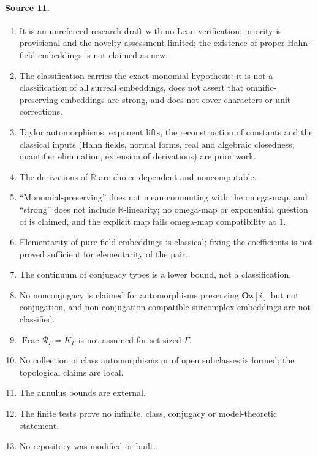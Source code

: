 \documentclass[11pt,oneside]{article}
\numberwithin{equation}{section}
\theoremstyle{definition}
\theoremstyle{remark}
\newcommand{\Og}{\mathbf{Oz}[i]}
\newcommand{\R}{\mathbb R}
\newcommand{\Frac}{\operatorname{Frac}}
\begin{document}
\paragraph{Source 11.}
\begin{enumerate}[itemsep=1pt]
\item It is an unrefereed research draft with no Lean verification; priority is
provisional and the novelty assessment limited; the existence of proper Hahn-field embeddings
is not claimed as new.
\item The classification carries the exact-monomial hypothesis: it is not a classification of
all surreal embeddings, does not assert that omnific-preserving embeddings are strong, and does
not cover characters or unit corrections.
\item Taylor automorphisms, exponent lifts, the reconstruction of constants and the classical
inputs (Hahn fields, normal forms, real and algebraic closedness, quantifier elimination,
extension of derivations) are prior work.
\item The derivations of $\R$ are choice-dependent and noncomputable.
\item ``Monomial-preserving'' does not mean commuting with the omega-map, and ``strong'' does
not include $\R$-linearity; no omega-map or exponential question of \cite{KKS} is claimed,
and the explicit map fails omega-map compatibility at $1$.
\item Elementarity of pure-field embeddings is classical; fixing the coefficients is not proved
sufficient for elementarity of the pair.
\item The continuum of conjugacy types is a lower bound, not a classification.
\item No nonconjugacy is claimed for automorphisms preserving $\Og$ but not conjugation, and
non-conjugation-compatible surcomplex embeddings are not classified.
\item $\Frac\mathcal R_\Gamma=K_\Gamma$ is not assumed for set-sized $\Gamma$.
\item No collection of class automorphisms or of open subclasses is formed; the topological
claims are local.
\item The annulus bounds are external.
\item The finite tests prove no infinite, class, conjugacy or model-theoretic statement.
\item No repository was modified or built.
\end{enumerate}
\end{document}
